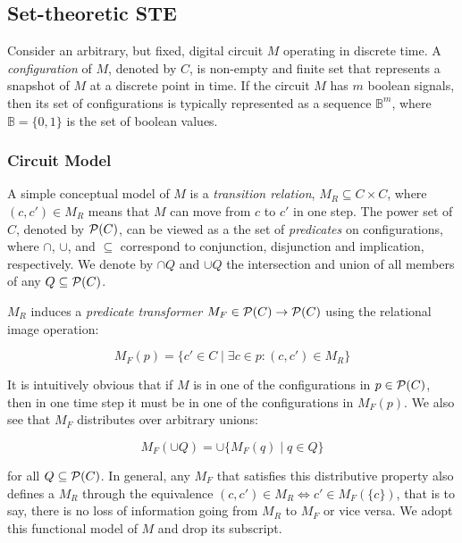 \subsection{Set-theoretic STE}

Consider an arbitrary, but fixed, digital circuit $M$ operating in discrete time. A \textit{configuration} of $M$, denoted by $C$, is non-empty and finite set that represents a snapshot of $M$ at a discrete point in time. If the circuit $M$ has $m$ boolean signals, then its set of configurations is typically represented as a sequence $\mathbb{B}^{m}$, where $\mathbb{B} = \{ 0,1 \}$ is the set of boolean values.

\subsubsection{Circuit Model} A simple conceptual model of $M$ is a \textit{transition relation}, $M_{R} \subseteq C \times C$, where $(c,c') \in M_{R}$ means that $M$ can move from $c$ to $c'$ in one step\footnotemark. The power set of $C$, denoted by $\mathcal{P}(C)$, can be viewed as a the set of \textit{predicates} on configurations, where $\cap$, $\cup$, and $\subseteq$ correspond to conjunction, disjunction and implication, respectively. We denote by $\cap Q$ and $\cup Q$ the intersection and union of all members of any $Q \subseteq \mathcal{P}(C)$.


$M_{R}$ induces a \textit{predicate transformer} $M_{F} \in \mathcal{P}(C) \rightarrow \mathcal{P}(C)$ using the relational image operation:

\begin{equation*}
M_{F}(p) = \{ c' \in C \mid \exists c \in p : (c,c') \in M_{R} \}
\end{equation*}

\noindent It is intuitively obvious that if $M$ is in one of the configurations in $p \in \mathcal{P}(C)$, then in one time step it must be in one of the configurations in $M_{F}(p)$. We also see that $M_{F}$ distributes over arbitrary unions:

\begin{equation*}
M_{F}(\cup Q) = \cup \{ M_{F}(q) \mid q \in Q \}
\end{equation*}

\noindent for all $Q \subseteq \mathcal{P}(C)$. In general, any $M_{F}$ that satisfies this distributive property also defines a $M_{R}$ through the equivalence $(c,c') \in M_{R} \iff c' \in M_{F}(\{ c \})$, that is to say, there is no loss of information going from $M_{R}$ to $M_{F}$ or vice versa. We adopt this functional model of $M$ and drop its subscript.


